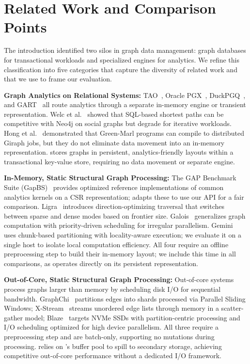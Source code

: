 \chapter{Related Work and Comparison Points}
\label{sec:related-work}
The introduction identified two silos in graph data management: graph databases for transactional workloads and specialized engines for analytics. We refine this classification into five categories that capture the diversity of related work and that we use to frame our evaluation.

\textbf{Graph Analytics on Relational Systems:}
TAO~\cite{bronson2013tao}, Oracle PGX~\cite{hong2015pgx,OraclePG,WhatIsOracleSpatialGraph:online}, DuckPGQ~\cite{duckpgq:online}, and GART~\cite{shen2023bridging} all route analytics through a separate in-memory engine or transient representation.
Welc et al.~\cite{welc2013graph,graphProcessingRDBMS} showed that SQL-based shortest paths can be competitive with Neo4j on social graphs but degrade for iterative workloads.
Hong et al.~\cite{hong2013early} demonstrated that Green-Marl programs can compile to distributed Giraph jobs, but they do not eliminate data movement into an in-memory representation.
\project{} stores graphs in persistent, analytics-friendly layouts within a transactional key-value store, requiring no data movement or separate engine.

\textbf{In-Memory, Static Structural Graph Processing:}
The GAP Benchmark Suite (GapBS)~\cite{beamer2015gap} provides optimized reference implementations of common analytics kernels on a CSR representation; \project{} adapts these to use our API for a fair comparison.
Ligra~\cite{shun2013ligra} introduces direction-optimizing traversal that switches between sparse and dense modes based on frontier size.
Galois~\cite{nguyen2013lightweight} generalizes graph computation with priority-driven scheduling for irregular parallelism.
Gemini~\cite{zhu2016gemini} uses chunk-based partitioning with locality-aware execution; we evaluate it on a single host to isolate local computation efficiency.
All four require an offline preprocessing step to build their in-memory layout; we include this time in all comparisons, as \project{} operates directly on its persistent representation.

\textbf{Out-of-Core, Static Structural Graph Processing:}
Out-of-core systems process graphs larger than memory by scheduling disk I/O for sequential bandwidth.
GraphChi~\cite{kyrola2012graphchi} partitions edges into shards processed via Parallel Sliding Windows;
X-Stream~\cite{roy2013x} streams unordered edge lists through memory in a scatter-gather model;
Blaze~\cite{kim2022blaze} targets NVMe SSDs with partition-centric processing and I/O scheduling optimized for high device parallelism.
All three require a preprocessing step and are batch-only, supporting no mutations during processing.
\project{} relies on \wt{}'s buffer pool to spill to secondary storage, achieving competitive out-of-core performance without a dedicated I/O framework.

